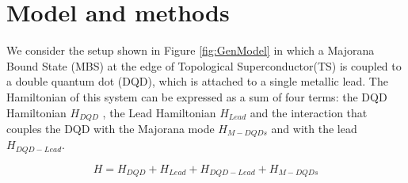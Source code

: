 \documentclass[showpacs,aps,prb,reprint,superscriptaddress]{revtex4-1}
\newcommand{\TS}[1]{{$\rightarrow$ {\sl#1}}}
\newcommand{\LUIS}[1]{\textcolor{blue}{\fbox{Luis} {\sl#1}}}
\begin{document}



\section{Model and methods}
\label{sec:modelmethods}





We consider the setup shown in Figure \ref{fig:GenModel} in which a Majorana Bound State (MBS) at the edge of Topological Superconductor(TS) is coupled to a double quantum dot (DQD), which is attached to a single metallic lead. The Hamiltonian of this system can be expressed as a sum of four terms: the DQD Hamiltonian $H_{DQD}$ , the Lead Hamiltonian $H_{Lead}$ and the interaction that couples the DQD with the Majorana mode $H_{M-DQDs}$ and  with the lead $H_{DQD-Lead}$. 

\begin{equation}
H=H_{DQD}+H_{Lead}+H_{DQD-Lead}+H_{M-DQDs} 
\label{eq:Ham}
\end{equation}
\end{document}
